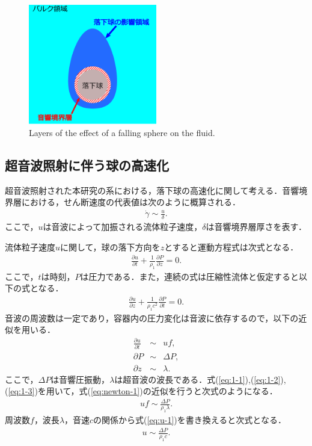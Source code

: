 \begin{figure}[ht]
    \centering
    \includegraphics[width=0.5\textwidth]{4-Theory/boundary_layer.eps}
    \caption{Layers of the effect of a falling sphere on the fluid.}
    \label{fig:layer}
\end{figure}

\subsection{超音波照射に伴う球の高速化}
\label{sec:UTdiff}
超音波照射された本研究の系における，落下球の高速化に関して考える．音響境界層における，せん断速度の代表値は次のように概算される．
\begin{eqnarray}
    \dot{\gamma} \sim \frac{u}{\delta} .
    \label{eq:abl-delta}
\end{eqnarray}
ここで，$u$は音波によって加振される流体粒子速度，$\delta$は音響境界層厚さを表す．

流体粒子速度$u$に関して，球の落下方向を$z$とすると運動方程式は次式となる．
\begin{eqnarray}
    \frac{\partial u}{\partial t} + \frac{1}{\rho_1}\frac{\partial P}{\partial z} = 0 .
    \label{eq:newton-1}
\end{eqnarray}
ここで，$t$は時刻，$P$は圧力である．また，連続の式は圧縮性流体と仮定すると以下の式となる．
\begin{eqnarray}
    \frac{\partial u}{\partial z} + \frac{1}{\rho_1 c^2}\frac{\partial P}{\partial t} = 0 .
\end{eqnarray}
音波の周波数は一定であり，容器内の圧力変化は音波に依存するので，以下の近似を用いる．
\begin{eqnarray}
    \frac{\partial u}{\partial t} &\sim& uf ,\label{eq:1-1}\\
    \partial P &\sim& \Delta P ,\label{eq:1-2}\\
    \partial z &\sim& \lambda .\label{eq:1-3}
\end{eqnarray}
ここで，$\Delta P$は音響圧振動，$\lambda$は超音波の波長である．式(\ref{eq:1-1}),(\ref{eq:1-2}),(\ref{eq:1-3})を用いて，式(\ref{eq:newton-1})の近似を行うと次式のようになる．
\begin{eqnarray}
    uf \sim \frac{\Delta P}{\rho_1 \lambda} .
    \label{eq:u-1}
\end{eqnarray}
周波数$f$，波長$\lambda$，音速$c$の関係から式(\ref{eq:u-1})を書き換えると次式となる．
\begin{eqnarray}
    u \sim \frac{\Delta P}{\rho_1 c} .
\end{eqnarray}

